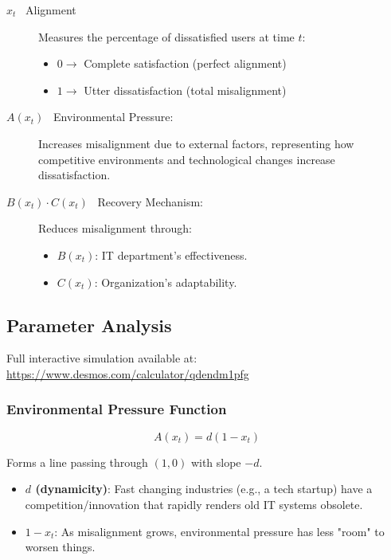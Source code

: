 \documentclass[a4paper, 10pt]{article}
\begin{document}
\begin{description}
	\item[$x_t$ \textendash\ Alignment] Measures the percentage of dissatisfied users at time $t$:
		\begin{itemize}
			\item $0 \rightarrow$ Complete satisfaction (perfect alignment)
			\item $1 \rightarrow$ Utter dissatisfaction (total misalignment)
		\end{itemize}

	\item[$A(x_t)$ \textendash\ Environmental Pressure:] Increases misalignment due to external factors, representing how competitive environments and technological changes increase dissatisfaction.

	\item[$B(x_t) \cdot C(x_t)$ \textendash\ Recovery Mechanism:] Reduces misalignment through:
		\begin{itemize}
			\item $B(x_t)$: IT department's effectiveness.
			\item $C(x_t)$: Organization's adaptability.
		\end{itemize}
\end{description}

\subsection{Parameter Analysis}
Full interactive simulation available at: \url{https://www.desmos.com/calculator/qdendm1pfg}

\subsubsection{Environmental Pressure Function}
\begin{equation}
	A(x_t) = d(1 - x_t)
\end{equation}

Forms a line passing through $(1, 0)$ with slope $-d$.
\begin{itemize}
	\item \textbf{$d$ (dynamicity)}: Fast changing industries (e.g., a tech startup) have a competition/innovation that rapidly renders old IT systems obsolete.
	\item \textbf{$1 - x_t$}: As misalignment grows, environmental pressure has less "room" to worsen things.
\end{itemize}
\end{document}
